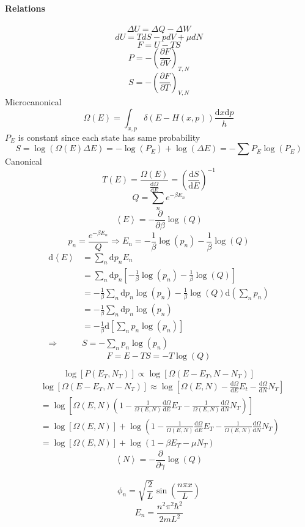 \documentclass[letterpaper]{article}
\providecommand{\ainner}[1]{\left\langle#1\right\rangle}
\def\d{\mathrm{d}}
\begin{document}
\begin{multicols}{2}
\footnotesize
\paragraph{Relations}
\[
\Delta U=\Delta Q-\Delta W
\]
\[
dU=TdS-pdV+\mu dN
\]
\[
F=U-TS
\]
\[
P=-\left(\frac{\partial F}{\partial V}\right)_{T,N}
\]
\[
S=-\left(\frac{\partial F}{\partial T}\right)_{V,N}
\]
Microcanonical
\[
\Omega(E)=\int_{x,p}\delta(E-H(x,p))\frac{\d x\d p}{h}
\]
$P_E$ is constant since each state has same probability
\[
S=\log(\Omega(E)\Delta E)=-\log(P_E)+\log(\Delta E)=-\sum P_E\log(P_E)
\]
Canonical
\[
T(E)=\frac{\Omega(E)}{\frac{\d\Omega}{\d E}}=\left(\frac{\d S}{\d
E}\right)^{-1}
\]
\[
Q=\sum_ne^{-\beta E_n}
\]
\[
\ainner{E}=-\frac{\partial}{\partial\beta}\log(Q)
\]
\[
p_n=\frac{e^{-\beta E_n}}{Q}\Rightarrow
E_n=-\frac{1}{\beta}\log(p_n)-\frac{1}{\beta}\log(Q)
\]
\begin{align*}
\d\ainner{E}&=\sum_n\d p_n E_n\\
&=\sum_n\d p_n\left[-\frac{1}{\beta}\log(p_n)-\frac{1}{\beta}\log(Q)\right]\\
&=-\frac{1}{\beta}\sum_n\d p_n\log(p_n)
-\frac{1}{\beta}\log(Q)\d\left(\sum_n p_n\right)\\
&=-\frac{1}{\beta}\sum_n\d p_n\log(p_n)\\
&=-\frac{1}{\beta}\d\left[\sum_n p_n\log(p_n)\right]\\
\Rightarrow&S=-\sum_n p_n\log(p_n)
\end{align*}
\[
F=E-TS=-T\log(Q)
\]

\[
\log[P(E_T,N_T)]\propto\log[\Omega(E-E_T,N-N_T)]
\]
\begin{align*}
&\log[\Omega(E-E_T,N-N_T)]\approx\log\left[\Omega(E,N)
-\frac{\d\Omega}{\d E}E_t-\frac{\d\Omega}{\d N}N_T\right]\\
&=\log\left[\Omega(E,N)\left(1-\frac{1}{\Omega(E,N)}\frac{\d\Omega}{\d E}E_T
-\frac{1}{\Omega(E,N)}\frac{\d\Omega}{\d N}N_T\right)\right]\\
&=\log[\Omega(E,N)]+\log\left(1-\frac{1}{\Omega(E,N)}\frac{\d\Omega}{\d E}E_T
-\frac{1}{\Omega(E,N)}\frac{\d\Omega}{\d N}N_T\right)\\
&=\log[\Omega(E,N)]+\log(1-\beta E_T-\mu N_T)
\end{align*}
\[
\ainner{N}=-\frac{\partial}{\partial\gamma}\log(Q)
\]

\[
\phi_n=\sqrt{\frac{2}{L}}\sin\left(\frac{n\pi x}{L}\right)
\]
\[
E_n=\frac{n^2\pi^2\hbar^2}{2mL^2}
\]


\end{multicols}
\end{document}
